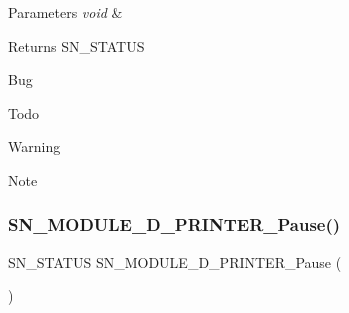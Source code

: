 \begin{DoxyParams}{Parameters}
{\em void} & \\
\hline
\end{DoxyParams}
\begin{DoxyReturn}{Returns}
S\+N\+\_\+\+S\+T\+A\+T\+US 
\end{DoxyReturn}
\begin{DoxyRefDesc}{Bug}
\item[\hyperlink{bug__bug000008}{Bug}]\end{DoxyRefDesc}
\begin{DoxyRefDesc}{Todo}
\item[\hyperlink{todo__todo000008}{Todo}]\end{DoxyRefDesc}
\begin{DoxyWarning}{Warning}

\end{DoxyWarning}
\begin{DoxyNote}{Note}

\end{DoxyNote}
\mbox{\label{group__Module_ga84a03238ddc0021011c12839757bf8c2}} 
\subsubsection{\texorpdfstring{S\+N\+\_\+\+M\+O\+D\+U\+L\+E\+\_\+D\+\_\+\+P\+R\+I\+N\+T\+E\+R\+\_\+\+Pause()}{SN\_MODULE\_3D\_PRINTER\_Pause()}}
{\footnotesize\ttfamily S\+N\+\_\+\+S\+T\+A\+T\+US S\+N\+\_\+\+M\+O\+D\+U\+L\+E\+\_\+D\+\_\+\+P\+R\+I\+N\+T\+E\+R\+\_\+\+Pause (\begin{DoxyParamCaption}\item[{void}]{ }\end{DoxyParamCaption})}


